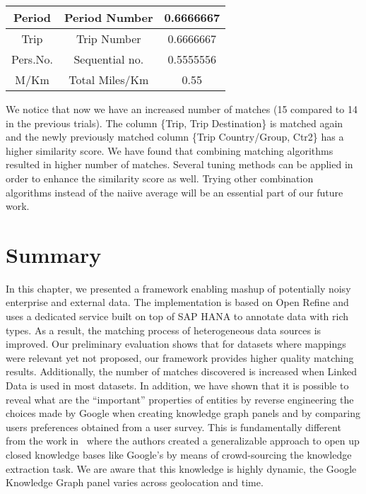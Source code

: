 \begin{table}[ht]
\begin{tabular}{|c|c|c|}
Period                         & Period Number                  & 0.6666667                         \\ \hline
Trip                           & Trip Number                    & 0.6666667                         \\ \hline
Pers.No.                       & Sequential no.                 & 0.5555556                         \\ \hline
M/Km                           & Total Miles/Km                 & 0.55                              \\ \hline
\end{tabular}
\end{table}

We notice that now we have an increased number of matches (15 compared to 14 in the previous trials). The column \{Trip, Trip Destination\} is matched again and the newly previously matched column \{Trip Country/Group, Ctr2\} has a higher similarity score. We have found that combining matching algorithms resulted in higher number of matches. Several tuning methods can be applied in order to enhance the similarity score as well. Trying other combination algorithms instead of the naiive average will be an essential part of our future work.



\section{Summary}

In this chapter, we presented a framework enabling mashup of potentially noisy enterprise and external data. The implementation is based on Open Refine and uses a dedicated service built on top of SAP HANA to annotate data with rich types. As a result, the matching process of heterogeneous data sources is improved. Our preliminary evaluation shows that for datasets where mappings were relevant yet not proposed, our framework provides higher quality matching results. Additionally, the number of matches discovered is increased when Linked Data is used in most datasets. In addition, we have shown that it is possible to reveal what are the ``important'' properties of entities by reverse engineering the choices made by Google when creating knowledge graph panels and by comparing  users preferences obtained from a user survey. This is fundamentally different from the work in~\cite{Steiner:IKEC:12} where the authors created a generalizable approach to open up closed knowledge bases like Google's by means of crowd-sourcing the knowledge extraction task. We are aware that this knowledge is highly dynamic, the Google Knowledge Graph panel varies across geolocation and time.
